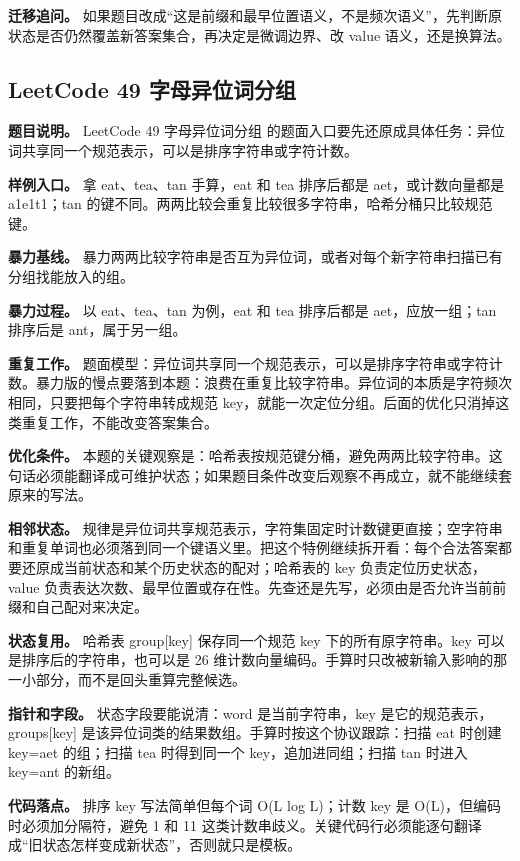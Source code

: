\textbf{迁移追问。} 如果题目改成“这是前缀和最早位置语义，不是频次语义”，先判断原状态是否仍然覆盖新答案集合，再决定是微调边界、改 value 语义，还是换算法。

\subsection{LeetCode 49 字母异位词分组}

\textbf{题目说明。} LeetCode 49 字母异位词分组 的题面入口要先还原成具体任务：异位词共享同一个规范表示，可以是排序字符串或字符计数。

\textbf{样例入口。} 拿 eat、tea、tan 手算，eat 和 tea 排序后都是 aet，或计数向量都是 a1e1t1；tan 的键不同。两两比较会重复比较很多字符串，哈希分桶只比较规范键。

\textbf{暴力基线。} 暴力两两比较字符串是否互为异位词，或者对每个新字符串扫描已有分组找能放入的组。

\textbf{暴力过程。} 以 eat、tea、tan 为例，eat 和 tea 排序后都是 aet，应放一组；tan 排序后是 ant，属于另一组。

\textbf{重复工作。} 题面模型：异位词共享同一个规范表示，可以是排序字符串或字符计数。暴力版的慢点要落到本题：浪费在重复比较字符串。异位词的本质是字符频次相同，只要把每个字符串转成规范 key，就能一次定位分组。后面的优化只消掉这类重复工作，不能改变答案集合。

\textbf{优化条件。} 本题的关键观察是：哈希表按规范键分桶，避免两两比较字符串。这句话必须能翻译成可维护状态；如果题目条件改变后观察不再成立，就不能继续套原来的写法。

\textbf{相邻状态。} 规律是异位词共享规范表示，字符集固定时计数键更直接；空字符串和重复单词也必须落到同一个键语义里。把这个特例继续拆开看：每个合法答案都要还原成当前状态和某个历史状态的配对；哈希表的 key 负责定位历史状态，value 负责表达次数、最早位置或存在性。先查还是先写，必须由是否允许当前前缀和自己配对来决定。

\textbf{状态复用。} 哈希表 group[key] 保存同一个规范 key 下的所有原字符串。key 可以是排序后的字符串，也可以是 26 维计数向量编码。手算时只改被新输入影响的那一小部分，而不是回头重算完整候选。

\textbf{指针和字段。} 状态字段要能说清：word 是当前字符串，key 是它的规范表示，groups[key] 是该异位词类的结果数组。手算时按这个协议跟踪：扫描 eat 时创建 key=aet 的组；扫描 tea 时得到同一个 key，追加进同组；扫描 tan 时进入 key=ant 的新组。

\textbf{代码落点。} 排序 key 写法简单但每个词 O(L log L)；计数 key 是 O(L)，但编码时必须加分隔符，避免 1 和 11 这类计数串歧义。关键代码行必须能逐句翻译成“旧状态怎样变成新状态”，否则就只是模板。

